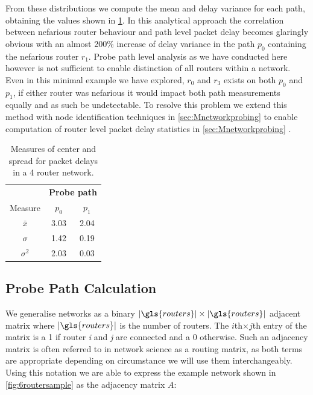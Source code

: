 From these distributions we compute the mean and delay variance for each path, obtaining the values shown in \cref{tbl:4routerstats}. In this analytical approach the correlation between nefarious router behaviour and path level packet delay becomes glaringly obvious with an almost 200\% increase of delay variance in the path $p_0$ containing the nefarious router $r_1$. Probe path level analysis as we have conducted here however is not sufficient to enable distinction of all routers within a network. Even in this minimal example we have explored, $r_0$ and $r_3$ exists on both $p_0$ and $p_1$, if either router was nefarious it would impact both path measurements equally and as such be undetectable. To resolve this problem we extend this method with node identification techniques in \cref{sec:Mnetworkprobing} to enable computation of router level packet delay statistics in \cref{sec:Mnetworkprobing} .
\begin{table}[H]
    \centering
    \begin{tabular}{@{}ccc@{}}
        \toprule
        & \multicolumn{2}{c}{\textbf{Probe path}}\\
        \cmidrule(lr){2-3}
        Measure & $p_0$ & $p_1$ \\
        \midrule
        $\bar{x}$   & 3.03 & 2.04 \\
        $\sigma$    & 1.42 & 0.19 \\
        $\sigma^2$  & 2.03 & 0.03 \\
        \bottomrule
    \end{tabular}
    \caption{Measures of center and spread for packet delays in a 4 router network.}
    \label{tbl:4routerstats}
\end{table}

\subsection{Probe Path Calculation}
\label{ssec:B7routerexample}
We generalise networks as a binary $|\gls{routers}|\times|\gls{routers}|$ adjacent matrix where $|\gls{routers}|$ is the number of routers. The $i$th$\times j$th entry of the matrix is a 1 if router \emph{i} and \emph{j} are connected and a 0 otherwise. Such an adjacency matrix is often referred to in network science as a routing matrix, as both terms are appropriate depending on circumstance we will use them interchangeably. Using this notation we are able to express the example network shown in \cref{fig:6routersample} as the adjacency matrix $A$:

